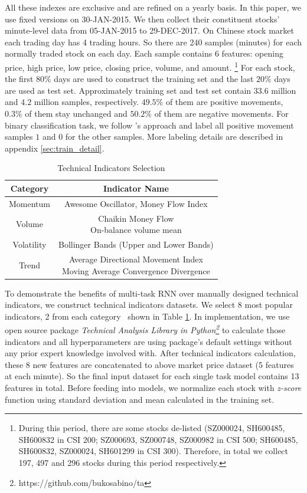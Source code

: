 All these indexes are exclusive and are refined on a yearly
basis. In this paper, we use fixed versions on 30-JAN-2015. We
then collect their constituent stocks' minute-level data from
05-JAN-2015 to 29-DEC-2017. On Chinese stock market each trading
day has 4 trading hours. So there are 240 samples (minutes) for
each normally traded stock on each day. Each sample contains 6
features: opening price, high price, low price, closing price,
volume, and amount. \footnote{During this period, there are some
  stocks de-listed (SZ000024, SH600485, SH600832 in CSI 200;
  SZ000693, SZ000748, SZ000982 in CSI 500; SH600485, SH600832,
  SZ000024, SH601299 in CSI 300). Therefore, in total we collect
  197, 497 and 296 stocks during this period respectively.} For
each stock, the first $80\%$ days are used to construct the
training set and the last $20\%$ days are used as test set.
Approximately training set and test set contain $33.6$ million
and $4.2$ million samples, respectively. $49.5\%$ of them are
positive movements, $0.3\%$ of them stay unchanged and $50.2\%$
of them are negative movements. For binary classification task,
we follow 's approach and
label all positive movement samples $1$ and $0$ for the other
samples. More labeling details are described in appendix
\ref{sec:train_detail}.

\begin{table}[H]
\centering
\small
\caption{Technical Indicators Selection}
\begin{tabular}{|c|c|} \hline
  Category&Indicator Name\\ \hline
  Momentum& Awesome Oscillator, Money Flow Index\\ \hline
  Volume& \makecell{Chaikin Money Flow\\ On-balance volume mean}\\ \hline
  Volatility& Bollinger Bands (Upper and Lower Bands)\\ \hline
  Trend& \makecell{Average Directional Movement Index\\Moving Average Convergence Divergence}\\ \hline
\end{tabular}
  \label{tab:ta}
\end{table}
To demonstrate the benefits of multi-task RNN over manually designed
technical indicators, we construct technical
indicators datasets. We select 8 most popular indicators, 2 from each
category~\cite{kirkpatrick2010technical} shown in Table
\ref{tab:ta}. In implementation, we use open source package
\emph{Technical Analysis Library in
  Python\footnote{https://github.com/bukosabino/ta}} to calculate
those indicators and all hyperparameters are using package's
default settings without any prior expert knowledge involved
with. After technical indicators calculation, these 8 new
features are concatenated to above market price dataset (5
features at each minute). So the final input dataset for each
single task model contains 13 features in total. Before feeding
into models, we normalize each stock with \emph{z-score} function
using standard deviation and mean calculated in the training set.

